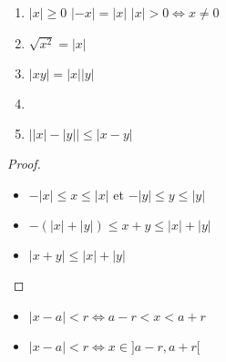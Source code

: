 \begin{frame}
\begin{proposition}
\begin{enumerate}
  \item $|x|\geq 0$ \quad \quad \quad  $|-x|=|x|$ \quad  \quad  \quad $|x|>0 \iff x\neq 0$
\pause
  \item $\sqrt{x^2}=|x|$
\pause
  \item $|xy|=|x||y|$
\pause
\medskip
  \item {}  
\pause
\medskip
  \item {} $\big||x|-|y|\big|\leq |x-y|$
\end{enumerate}
\end{proposition}

\pause
\bigskip


\end{frame}

\begin{frame}

\begin{proof}
\pause
\begin{itemize}
 \item $-|x|\leq x \leq |x|$ \quad et \quad $-|y|\leq y \leq |y|$
 \pause
 \item $-\left(|x|+|y|\right)\leq x+y\leq |x|+|y|$
 \pause
 \item $|x+y|\leq |x|+|y|$
\end{itemize}
\vspace*{-2ex}
\end{proof}

 \pause
 
\begin{remarque}
\begin{itemize}
  \item $|x-a|<r \iff a-r< x <a+r$
  \pause
  \item  $|x-a|<r \iff x \in ]a-r,a+r[$
\end{itemize}
\pause
{}
\end{remarque}
\end{frame}

